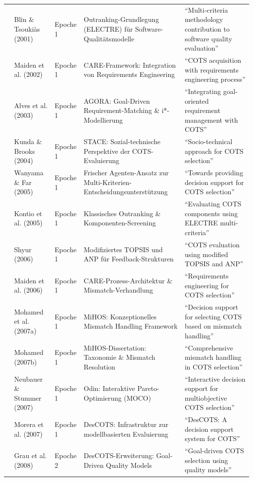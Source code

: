 \begin{longtable}{p{2.2cm} p{2.8cm} p{1.8cm} p{4.2cm} p{3.5cm}}
\cite{M3B2D3GD} & Blin \& Tsoukiàs (2001) & Epoche 1 & Outranking-Grundlegung (ELECTRE) für Software-Qualitätsmodelle & \enquote{Multi-criteria methodology contribution to software quality evaluation} \\
\cite{TLB687YL} & Maiden et al. (2002) & Epoche 1 & CARE-Framework: Integration von Requirements Engineering & \enquote{COTS acquisition with requirements engineering process} \\
\cite{8XNYS4M9} & Alves et al. (2003) & Epoche 1 & AGORA: Goal-Driven Requirement-Matching \& i*-Modellierung & \enquote{Integrating goal-oriented requirement management with COTS} \\
\cite{QDUNCXFC} & Kunda \& Brooks (2004) & Epoche 1 & STACE: Sozial-technische Perspektive der COTS-Evaluierung & \enquote{Socio-technical approach for COTS selection} \\
\cite{CZZ6XQZJ} & Wanyama \& Far (2005) & Epoche 1 & Frischer Agenten-Ansatz zur Multi-Kriterien-Entscheidungsunterstützung & \enquote{Towards providing decision support for COTS selection} \\
\cite{LZQJ6M4X} & Kontio et al. (2005) & Epoche 1 & Klassisches Outranking \& Komponenten-Screening & \enquote{Evaluating COTS components using ELECTRE multi-criteria} \\
\cite{U5JPV4SF} & Shyur (2006) & Epoche 1 & Modifiziertes TOPSIS und ANP für Feedback-Strukturen & \enquote{COTS evaluation using modified TOPSIS and ANP} \\
\cite{6RNULWVY} & Maiden et al. (2006) & Epoche 1 & CARE-Prozess-Architektur \& Mismatch-Verhandlung & \enquote{Requirements engineering for COTS selection} \\
\cite{MC9UMXZZ} & Mohamed et al. (2007a) & Epoche 1 & MiHOS: Konzeptionelles Mismatch Handling Framework & \enquote{Decision support for selecting COTS based on mismatch handling} \\
\cite{9F79VAAB} & Mohamed (2007b) & Epoche 1 & MiHOS-Dissertation: Taxonomie \& Mismatch Resolution & \enquote{Comprehensive mismatch handling in COTS selection} \\
\cite{ZQMG69VT} & Neubauer \& Stummer (2007) & Epoche 1 & Odin: Interaktive Pareto-Optimierung (MOCO) & \enquote{Interactive decision support for multiobjective COTS selection} \\
\cite{FCYW9EWJ} & Morera et al. (2007) & Epoche 1 & DesCOTS: Infrastruktur zur modellbasierten Evaluierung & \enquote{DesCOTS: A decision support system for COTS} \\
\cite{DAU8NSK8} & Grau et al. (2008) & Epoche 2 & DesCOTS-Erweiterung: Goal-Driven Quality Models & \enquote{Goal-driven COTS selection using quality models} \\

\end{longtable}
